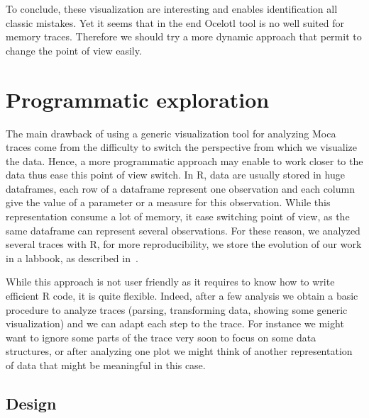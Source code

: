 To conclude, these visualization are interesting and enables identification all classic mistakes.
Yet it seems that in the end \gls{Ocelotl} tool is no well suited for memory traces.
Therefore we should try a more dynamic approach that permit to change the point of view easily.

\section{Programmatic exploration}
\label{sec:visu-second}

The main drawback of using a generic visualization tool for analyzing \gls{Moca} traces come from the difficulty to switch the perspective from which we visualize the data.
Hence, a more programmatic approach may enable to work closer to the data thus ease this point of view switch.
In \gls{R}, data are usually stored in huge dataframes, each row of a dataframe represent one observation and each column give the value of a parameter or a measure for this observation.
While this representation consume a lot of memory, it ease switching point of view, as the same dataframe can represent several observations.
For these reason, we analyzed several traces with \gls{R}, for more reproducibility, we store the evolution of our work in a labbook, as described in~\cite[Chapter~4,p~54]{Stanisic15Reproducible}.

While this approach is not user friendly as it requires to know how to write efficient \gls{R} code, it is quite flexible.
Indeed, after a few analysis we obtain a basic procedure to analyze traces (parsing, transforming data, showing some generic visualization) and we can adapt each step to the trace.
For instance we might want to ignore some parts of the trace very soon to focus on some data structures, or after analyzing one plot we might think of another representation of data that might be meaningful in this case.

\subsection{Design}

